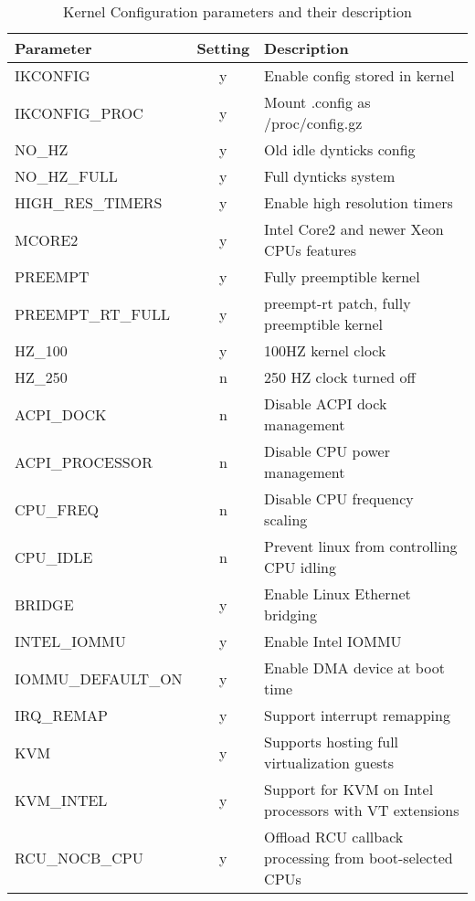 \begin{table}
    \centering
    \caption{Kernel Configuration parameters and their description}
    \label{tab:kernel_config_table}
\begin{tabular}{|l|c|p{8cm}|}
\hline
Parameter & Setting & Description \\
\hline 
\hline
IKCONFIG & y          &   Enable config stored in kernel \\
IKCONFIG\_PROC & y    &   Mount .config as /proc/config.gz \\
NO\_HZ & y            &   Old idle dynticks config \\
NO\_HZ\_FULL & y      &   Full dynticks system \\
HIGH\_RES\_TIMERS & y &   Enable high resolution timers\\
MCORE2 & y            &   Intel Core2 and newer Xeon CPUs features\\
PREEMPT & y           &   Fully preemptible kernel \\
PREEMPT\_RT\_FULL & y &   preempt-rt patch, fully preemptible kernel \\
HZ\_100 & y           &   100HZ kernel clock \\
HZ\_250 & n           &   250 HZ clock turned off \\
ACPI\_DOCK & n        &   Disable ACPI dock management \\
ACPI\_PROCESSOR & n   &   Disable CPU power management \\
CPU\_FREQ & n         &   Disable CPU frequency scaling \\
CPU\_IDLE & n         &   Prevent linux from controlling CPU idling \\
BRIDGE & y            &   Enable Linux Ethernet bridging \\
INTEL\_IOMMU & y      &   Enable Intel IOMMU  \\
IOMMU\_DEFAULT\_ON & y&   Enable DMA device at boot time \\
IRQ\_REMAP & y        &   Support interrupt remapping \\
KVM & y               &   Supports hosting full virtualization guests \\
KVM\_INTEL & y        &   Support for KVM on Intel processors with VT extensions \\
RCU\_NOCB\_CPU & y    &   Offload RCU callback processing from boot-selected CPUs\\
\hline
\end{tabular}
\end{table}
